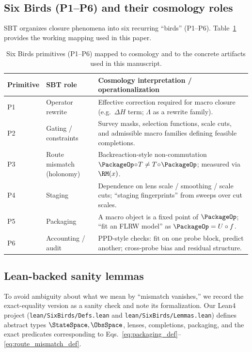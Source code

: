 \documentclass[11pt]{article}
\theoremstyle{definition}
\theoremstyle{plain}
\theoremstyle{remark}
\begin{document}
\subsection{Six Birds (P1--P6) and their cosmology roles}\label{sec:framework:p1p6}
SBT organizes closure phenomena into six recurring ``birds'' (P1--P6).
Table~\ref{tab:p1p6_map} provides the working mapping used in this paper.

\begin{table}[t]
\centering
\caption{Six Birds primitives (P1--P6) mapped to cosmology and to the concrete artifacts used in this manuscript.}
\label{tab:p1p6_map}
\begin{tabular}{@{}lll@{}}
\toprule
Primitive & SBT role & Cosmology interpretation / operationalization \\
\midrule
P1 & Operator rewrite &
Effective correction required for macro closure (e.g.\ $\Delta H$ term; $\Lambda$ as a rewrite family). \\
P2 & Gating / constraints &
Survey masks, selection functions, scale cuts, and admissible macro families defining feasible completions. \\
P3 & Route mismatch (holonomy) &
Backreaction-style non-commutation $\PackageOp\!\circ\!T\neq T\!\circ\!\PackageOp$; measured via $\RM(x)$. \\
P4 & Staging &
Dependence on lens scale / smoothing / scale cuts; ``staging fingerprints'' from sweeps over cut scales. \\
P5 & Packaging &
A macro object is a fixed point of $\PackageOp$; ``fit an FLRW model'' as $\PackageOp=U\circ f$. \\
P6 & Accounting / audit &
PPD-style checks: fit on one probe block, predict another; cross-probe bias and residual structure. \\
\bottomrule
\end{tabular}
\end{table}

\subsection{Lean-backed sanity lemmas}\label{sec:framework:lean}
To avoid ambiguity about what we mean by ``mismatch vanishes,'' we record the exact-equality version as a sanity check and note its formalization.
Our Lean4 project (\texttt{lean/SixBirds/Defs.lean} and \texttt{lean/SixBirds/Lemmas.lean}) defines abstract types $\StateSpace,\ObsSpace$, lenses, completions, packaging, and the exact predicates corresponding to Eqs.~\eqref{eq:packaging_def}--\eqref{eq:route_mismatch_def}.
\end{document}

